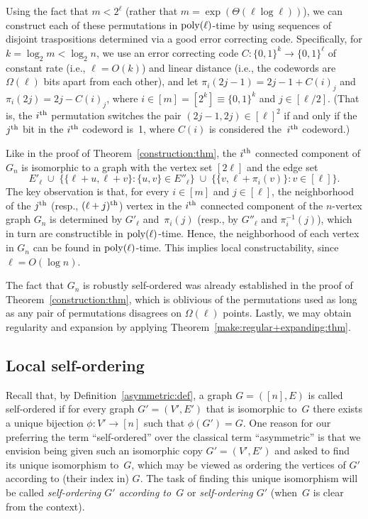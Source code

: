 \documentclass[10pt,a4paper]{article}
\theoremstyle{definition}
\newcommand{\bitset}{\{0,1\}}
\newcommand{\xth}{{\rm th}}
\newcommand{\poly}{{\rm poly}}
\begin{document}
Using the fact that $m<2^\ell$
(rather that $m=\exp(\Theta(\ell\log\ell))$),
we can construct each of these permutations in $\poly(\ell)$-time
by using sequences of disjoint traspositions determined
via a good error correcting code.
Specifically, for $k=\log_2m<\log_2n$,
we use an error correcting code $C:\bitset^k\to\bitset^\ell$
of constant rate (i.e., $\ell=O(k)$) and linear distance
(i.e., the codewords are $\Omega(\ell)$ bits apart from each other),
and let $\pi_i(2j-1)=2j-1+C(i)_j$ and $\pi_i(2j)=2j-C(i)_j$,
where $i\in[m]=[2^k]\equiv\bitset^k$ and $j\in[\ell/2]$.
(That is, the $i^\xth$ permutation switches the pair $(2j-1,2j)\in[\ell]^2$
if and only if the $j^\xth$ bit in the $i^\xth$ codeword is~1,
where $C(i)$ is considered the~$i^\xth$ codeword.)

Like in the proof of Theorem~\ref{construction:thm},
the $i^\xth$ connected component of $G_n$ is isomorphic
to a graph with the vertex set $[2\ell]$
and the edge set
\begin{equation}\label{edges-of-cc:eq}
E'_\ell \;\cup\; \{\{\ell+u,\ell+v\}:\{u,v\}\in E''_\ell\}
         \;\cup\; \{\{v,\ell+\pi_i(v)\}:v\!\in\![\ell]\}.
\end{equation}
The key observation is that, for every $i\in[m]$ and $j\in[\ell]$,
the neighborhood of the $j^\xth$ (resp., $(\ell+j)^\xth$) vertex
in the $i^\xth$ connected component of the $n$-vertex graph $G_n$
is determined by $G'_\ell$ and~$\pi_i(j)$
(resp., by $G''_\ell$ and $\pi_i^{-1}(j)$),
which in turn are constructible in $\poly(\ell)$-time.
Hence, the neighborhood of each vertex in $G_n$
can be found in $\poly(\ell)$-time.
This implies local constructability, since $\ell=O(\log n)$.

The fact that $G_n$ is robustly self-ordered was already
established in the proof of Theorem~\ref{construction:thm},
which is oblivious of the permutations used as long as any
pair of permutations disagrees on $\Omega(\ell)$ points.
Lastly, we may obtain regularity and expansion
by applying Theorem~\ref{make:regular+expanding:thm}.
%
%
%
%
\EPF


%
%
\subsection{Local self-ordering}
\label{local-so:sec}
Recall that, by Definition~\ref{asymmetric:def},
a graph $G=([n],E)$ is called {\sf self-ordered}
if for every graph $G'=(V',E')$ that is isomorphic to~$G$
there exists a unique bijection $\phi:V'\to[n]$ such that $\phi(G')=G$.
One reason for our preferring the term ``self-ordered'' over
the classical term ``asymmetric'' is that we envision being
given such an isomorphic copy $G'=(V',E')$ and asked to find its
unique isomorphism to~$G$, which may be viewed as ordering
the vertices of $G'$ according to (their index in) $G$.
The task of finding this unique isomorphism
will be called {\em self-ordering $G'$ according to~$G$}\/
or {\em self-ordering $G'$}\/ (when~$G$ is clear from the context).
\end{document}
